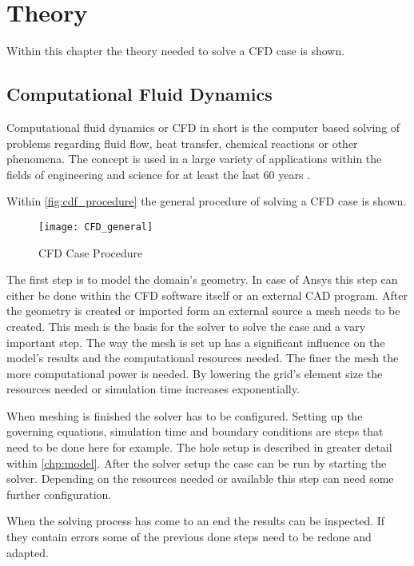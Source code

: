 \documentclass[../thesis.tex]{subfiles}
\begin{document}
\chapter{Theory}
\label{chp:theory}

Within this chapter the theory needed to solve a CFD case is shown.

\section{Computational Fluid Dynamics}

Computational fluid dynamics or CFD in short is the computer based solving of problems regarding fluid flow, heat transfer, chemical reactions or other phenomena. The concept is used in a large variety of applications within the fields of engineering and science for at least the last 60 years \cite{versteeg2007introduction}.

Within \autoref{fig:cdf_procedure} the general procedure of solving a CFD case is shown.
\begin{figure}[htbp]
	\centering
	\texttt{[image: CFD\_general]}
	\caption{CFD Case Procedure}
	\label{fig:cdf_procedure}
\end{figure}

The first step is to model the domain's geometry. In case of Ansys this step can either be done within the CFD software itself or an external CAD program. After the geometry is created or imported form an external source a mesh needs to be created. This mesh is the basis for the solver to solve the case and a vary important step. The way the mesh is set up has a significant influence on the model's results and the computational resources needed. The finer the mesh the more computational power is needed. By lowering the grid's element size the resources needed or simulation time increases exponentially.

When meshing is finished the solver has to be configured. Setting up the governing equations, simulation time and boundary conditions are steps that need to be done here for example. The hole setup is described in greater detail within \autoref{chp:model}. After the solver setup the case can be run by starting the solver. Depending on the resources needed or available this step can need some further configuration.

When the solving process has come to an end the results can be inspected. If they contain errors some of the previous done steps need to be redone and adapted. 
\end{document}
